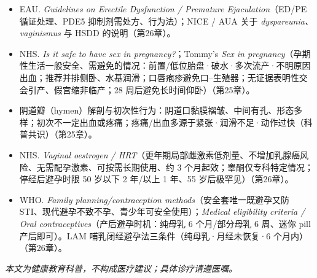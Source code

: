 \begin{itemize}[leftmargin=2em]
  \item EAU. \emph{Guidelines on Erectile Dysfunction / Premature Ejaculation}（ED/PE 循证处理、PDE5 抑制剂需处方、行为法）；NICE / AUA 关于 \emph{dyspareunia、vaginismus} 与 HSDD 的说明（第26章）。
  \item NHS. \emph{Is it safe to have sex in pregnancy?}；Tommy's \emph{Sex in pregnancy}（孕期性生活一般安全、需避免的情况：前置/低位胎盘·破水·多次流产·不明原因出血；推荐并排侧卧、水基润滑；口唇疱疹避免口--生殖器；无证据表明性交会引产、假宫缩非临产；28 周后避免长时间仰卧）（第25章）。
  \item 阴道瓣（hymen）解剖与初次性行为：阴道口黏膜褶皱、中间有孔、形态多样；初次不一定出血或疼痛；疼痛/出血多源于紧张·润滑不足·动作过快（科普共识）（第25章）。
  \item NHS. \emph{Vaginal oestrogen / HRT}（更年期局部雌激素低剂量、不增加乳腺癌风险、无需配孕激素、可按需长期使用、约 3 个月起效；睾酮仅专科特定情况；停经后避孕时限 50 岁以下 2 年/以上 1 年、55 岁后极罕见）（第26章）。
  \item WHO. \emph{Family planning/contraception methods}（安全套唯一既避孕又防 STI、现代避孕不致不孕、青少年可安全使用）；\emph{Medical eligibility criteria / Oral contraceptives}（产后避孕时机：纯母乳 6 个月/部分母乳 6 周、迷你 pill 产后即可）。LAM 哺乳闭经避孕法三条件（纯母乳·月经未恢复·6 个月内）（第26章）。
\end{itemize}

\begin{center}
\itshape 本文为健康教育科普，不构成医疗建议；具体诊疗请遵医嘱。
\end{center}
